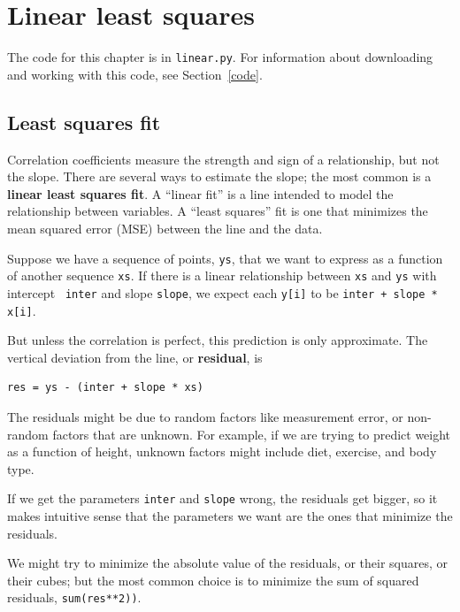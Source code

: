 \documentclass[12pt]{book}
\begin{document}
\chapter{Linear least squares}
\label{linear}

The code for this chapter is in {\tt linear.py}.  For information
about downloading and working with this code, see Section~\ref{code}.


\section{Least squares fit}

Correlation coefficients measure the strength and sign of a
relationship, but not the slope.  There are several ways to estimate
the slope; the most common is a {\bf linear least squares fit}.  A
``linear fit'' is a line intended to model the relationship between
variables.  A ``least squares'' fit is one that minimizes the mean
squared error (MSE) between the line and the data.

Suppose we have a sequence of points, {\tt ys}, that we want to
express as a function of another sequence {\tt xs}.  If there is a
linear relationship between {\tt xs} and {\tt ys} with intercept {\tt
  inter} and slope {\tt slope}, we expect each {\tt y[i]} to be
{\tt inter + slope * x[i]}.  

But unless the correlation is perfect, this prediction is only
approximate.  The vertical deviation from the line, or {\bf residual},
is

\begin{verbatim}
res = ys - (inter + slope * xs)
\end{verbatim}

The residuals might be due to random factors like measurement error,
or non-random factors that are unknown.  For example, if we are
trying to predict weight as a function of height, unknown factors
might include diet, exercise, and body type.

If we get the parameters {\tt inter} and {\tt slope} wrong, the residuals
get bigger, so it makes intuitive sense that the parameters we want
are the ones that minimize the residuals.

We might try to minimize the absolute value of the
residuals, or their squares, or their cubes; but the most common
choice is to minimize the sum of squared residuals,
{\tt sum(res**2))}.
\end{document}
